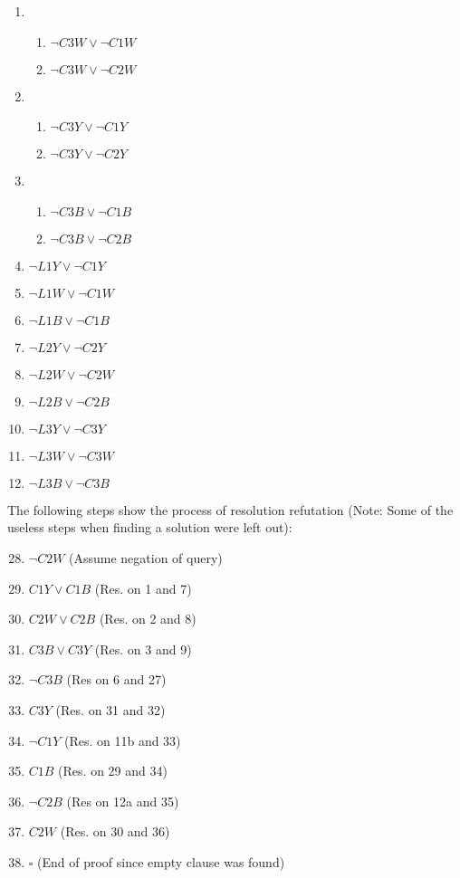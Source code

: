\documentclass[22pt]{article}
\begin{document}
\begin{multicols}{2}
\begin{enumerate}
	\item
	\begin{enumerate}
		\item $\neg C3W \lor \neg C1W$
		\item $\neg C3W \lor \neg C2W$
	\end{enumerate}

	\item
	\begin{enumerate}
		\item $\neg C3Y \lor \neg C1Y$
		\item $\neg C3Y \lor \neg C2Y$
	\end{enumerate}

	\item
	\begin{enumerate}
		\item $\neg C3B \lor \neg C1B$
		\item $\neg C3B \lor \neg C2B$
	\end{enumerate}

	\item $\neg L1Y \lor \neg C1Y$
	\item $\neg L1W \lor \neg C1W$
	\item $\neg L1B \lor \neg C1B$
	\item $\neg L2Y \lor \neg C2Y$
	\item $\neg L2W \lor \neg C2W$
	\item $\neg L2B \lor \neg C2B$
	\item $\neg L3Y \lor \neg C3Y$
	\item $\neg L3W \lor \neg C3W$
	\item $\neg L3B \lor \neg C3B$
\end{enumerate}
\end{multicols}

The following steps show the process of resolution refutation (Note: 
Some of the useless steps when finding a solution were left out):

\begin{multicols}{2}
\begin{enumerate}
	\setcounter{enumi}{27}
	\item $\neg C2W$ (Assume negation of query)
	\item $C1Y \lor C1B$ (Res. on 1 and 7)
	\item $C2W \lor C2B$ (Res. on 2 and 8)
	\item $C3B \lor C3Y$ (Res. on 3 and 9)
	\item $\neg C3B$ (Res on 6 and 27)
	\item $C3Y$ (Res. on 31 and 32)
	\item $\neg C1Y$ (Res. on 11b and 33)
	\item $C1B$ (Res. on 29 and 34)
	\item $\neg C2B$ (Res on 12a and 35)
	\item $C2W$ (Res. on 30 and 36)
	\item $\square$ (End of proof since empty clause was found)
\end{enumerate}
\end{multicols}
\end{document}
